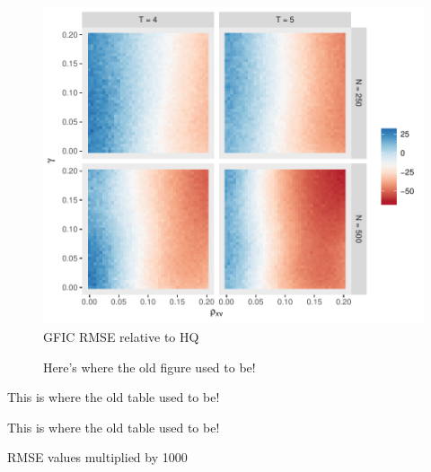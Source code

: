 \begin{figure}
\centering
\includegraphics[scale = 0.8]{./simulations/DynamicPanel/results/Dpanel_GFIC_RMSE_rel_HQ}
\caption{GFIC RMSE relative to HQ}
\end{figure}

\begin{figure}
\centering
\caption{Here's where the old figure used to be!}
\label{fig:advantage}
\end{figure}




\begin{table}[!tbp]
  \centering
\caption{This is where the old table used to be!}
\label{tab:rel}
\end{table}


\begin{table}[!tbp]
  \centering
\caption{This is where the old table used to be!}
\label{tab:rmse}
\end{table}
\begin{table}
  \footnotesize
  \centering
  
  \caption{RMSE values multiplied by 1000}
\end{table}



